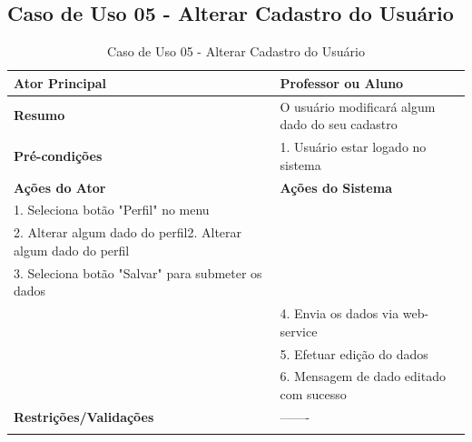 \subsection{Caso de Uso 05 - Alterar Cadastro do Usuário}
\label{sc:case5}
\begin{center}
\begin{longtable}{p{8cm}|p{8cm}}
    \hline
    \textbf{Ator Principal} & Professor ou Aluno \\
    \hline
    \textbf{Resumo} & O usuário modificará algum dado do seu cadastro \\
    \hline
    \textbf{Pr\'{e}-condi\c{c}\~{o}es} & 1. Usuário estar logado no sistema \\
    \hline
    \textbf{A\c{c}\~{o}es do Ator} & \textbf{A\c{c}\~{o}es do Sistema} \\
    
    \hline
    1. Seleciona botão "Perfil" no menu & \\
    \hline
    2. Alterar algum dado do perfil2. Alterar algum dado do perfil \\
    \hline
    3. Seleciona botão "Salvar" para submeter os dados \\
    \hline
    & 4. Envia os dados via web-service \\
    \hline
    & 5. Efetuar edição do dados \\
    \hline
    & 6. Mensagem de dado editado com sucesso \\
    \hline
    \hline
    \textbf{Restri\c{c}\~{o}es/Valida\c{c}\~{o}es} & -------\\
\hline
\caption{Caso de Uso 05 - Alterar Cadastro do Usuário}
\end{longtable}
\end{center}


